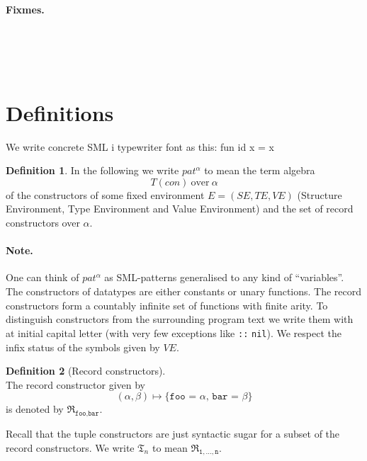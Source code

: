 \documentclass[oneside]{memoir}
\newenvironment{code}
{\quote\Verbatim}
{\endquote\endVerbatim}
\newcommand{\codeinline}[1]{\texttt{#1}}
\theoremstyle{definition}
\newtheorem{definition}{Definition}
\begin{document}
\listoffixmes{}

\paragraph{Fixmes.} \ \\
 \ \\

 \ \\

\section{Definitions}
We write concrete SML i typewriter font as this:
\begin{code}
fun id x = x
\end{code}

\begin{definition}
In the following we write $pat^\alpha$ to mean the term algebra
\[
T(con)\ \text{over}\ \alpha
\]
of the constructors of some fixed environment $E = (S\!E, T\!E, V\!E)$ (Structure
Environment, Type Environment and Value Environment) and the set of record
constructors over $\alpha$. 

\end{definition}

\paragraph{Note.} One can think of $pat^\alpha$ as SML-patterns generalised to
any kind of ``variables''. The constructors of datatypes are either constants or
unary functions. The record constructors form a countably infinite set of
functions with finite arity. To distinguish constructors from the surrounding
program text we write them with at initial capital letter (with very few
exceptions like \codeinline{::} \codeinline{nil}). We respect the infix status
of the symbols given by $V\!E$.

\begin{definition}[Record constructors] \ \\
  The record constructor given by
  \[
  (\alpha, \beta) \mapsto \texttt{\{foo = $\alpha$, bar = $\beta$\}}
  \]
  is denoted by $\mathfrak{R}_{\texttt{foo},\texttt{bar}}$.

  Recall that the tuple constructors are just syntactic sugar for a subset of
  the record constructors. We write $\mathfrak{T}_n$ to mean
  $\mathfrak{R}_{\texttt{1},\ldots,\texttt{n}}$.
\end{definition}
\end{document}

